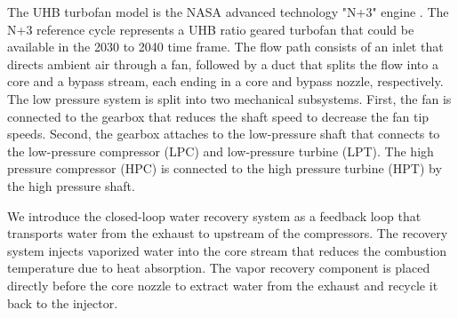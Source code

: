 \documentclass[conf]{new-aiaa}
\begin{document}
The UHB turbofan model is the NASA advanced technology "N+3" engine \cite{Jones2017a}.
The N+3 reference cycle represents a UHB ratio geared turbofan that could be available in the 2030 to 2040 time frame.
The flow path consists of an inlet that directs ambient air through a fan, followed by a duct that splits the flow into a core and a bypass stream, each ending in a core and bypass nozzle, respectively.
The low pressure system is split into two mechanical subsystems.
First, the fan is connected to the gearbox that reduces the shaft speed to decrease the fan tip speeds.
Second, the gearbox attaches to the low-pressure shaft that connects to the low-pressure compressor (LPC) and low-pressure turbine (LPT).
The high pressure compressor (HPC) is connected to the high pressure turbine (HPT) by the high pressure shaft.

We introduce the closed-loop water recovery system as a feedback loop that transports water from the exhaust to upstream of the compressors.
The recovery system injects vaporized water into the core stream that reduces the combustion temperature due to heat absorption.
The vapor recovery component is placed directly before the core nozzle to extract water from the exhaust and recycle it back to the injector.
\end{document}

